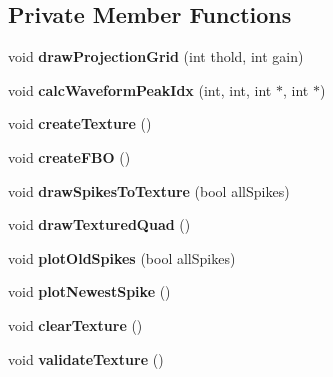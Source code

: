 \subsection*{Private Member Functions}
\begin{DoxyCompactItemize}
\item 
\hypertarget{classProjectionAxes_adf8c6ab7587cfd2f68bcd921c0deefd5}{void {\bfseries draw\-Projection\-Grid} (int thold, int gain)}\label{classProjectionAxes_adf8c6ab7587cfd2f68bcd921c0deefd5}

\item 
\hypertarget{classProjectionAxes_a79002692644c7b571edfafdcb3e2ed38}{void {\bfseries calc\-Waveform\-Peak\-Idx} (int, int, int $\ast$, int $\ast$)}\label{classProjectionAxes_a79002692644c7b571edfafdcb3e2ed38}

\item 
\hypertarget{classProjectionAxes_a46b514befc5d4cd1309e9a88fad72a3e}{void {\bfseries create\-Texture} ()}\label{classProjectionAxes_a46b514befc5d4cd1309e9a88fad72a3e}

\item 
\hypertarget{classProjectionAxes_a3e3a0956302f8b1e92ce542301e6c8e1}{void {\bfseries create\-F\-B\-O} ()}\label{classProjectionAxes_a3e3a0956302f8b1e92ce542301e6c8e1}

\item 
\hypertarget{classProjectionAxes_a26ae1675878b7db62b06fc97ae96b17e}{void {\bfseries draw\-Spikes\-To\-Texture} (bool all\-Spikes)}\label{classProjectionAxes_a26ae1675878b7db62b06fc97ae96b17e}

\item 
\hypertarget{classProjectionAxes_a662c5addb15eb47a381dab098128ddab}{void {\bfseries draw\-Textured\-Quad} ()}\label{classProjectionAxes_a662c5addb15eb47a381dab098128ddab}

\item 
\hypertarget{classProjectionAxes_a5d16f25291dce8fcac912d8759c9af1c}{void {\bfseries plot\-Old\-Spikes} (bool all\-Spikes)}\label{classProjectionAxes_a5d16f25291dce8fcac912d8759c9af1c}

\item 
\hypertarget{classProjectionAxes_a093baf0ba53ad3dd8b7bee92b3874665}{void {\bfseries plot\-Newest\-Spike} ()}\label{classProjectionAxes_a093baf0ba53ad3dd8b7bee92b3874665}

\item 
\hypertarget{classProjectionAxes_a2150462895139ddbf32632057e9c4df6}{void {\bfseries clear\-Texture} ()}\label{classProjectionAxes_a2150462895139ddbf32632057e9c4df6}

\item 
\hypertarget{classProjectionAxes_a5b3c3c7be28c6f82a403aeeab069272b}{void {\bfseries validate\-Texture} ()}\label{classProjectionAxes_a5b3c3c7be28c6f82a403aeeab069272b}

\end{DoxyCompactItemize}
